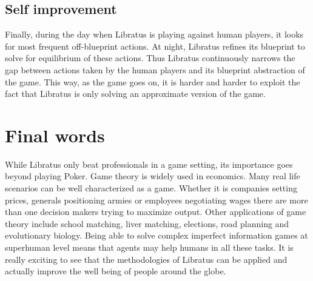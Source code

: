 \documentclass[10pt,a4paper]{article}
\begin{document}
\subsection{Self improvement}
Finally, during the day when Libratus is playing against human players, it looks for most frequent off-blueprint actions. At night, Libratus refines its blueprint to solve for equilibrium of these actions. Thus Libratus continuously narrows the gap between actions taken by the human players and its blueprint abstraction of the game. This way, as the game goes on, it is harder and harder to exploit the fact that Libratus is only solving an approximate version of the game. 

\section{Final words}
While Libratus only beat professionals in a game setting, its importance goes beyond playing Poker. Game theory is widely used in economics. Many real life scenarios can be well characterized as a game. Whether it is companies setting prices, generals positioning armies or employees negotiating wages there are more than one decision makers trying to maximize output. Other applications of game theory include school matching, liver matching, elections, road planning and evolutionary biology. Being able to solve complex imperfect information games at superhuman level means that agents may help humans in all these tasks. It is really exciting to see that the methodologies of Libratus can be applied and actually improve the well being of people around the globe.


\newpage


\end{document}
